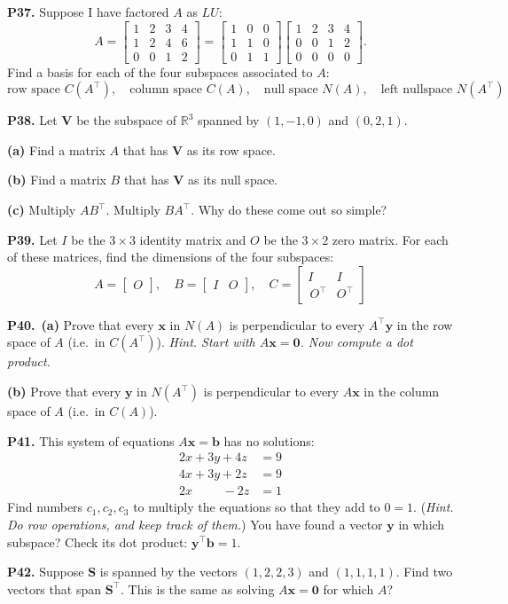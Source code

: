 \documentclass[12pt]{amsart}
\newcommand{\bb}{\bm{b}}
\newcommand{\bx}{\bm{x}}
\newcommand{\by}{\bm{y}}
\newcommand{\bS}{\bm{S}}
\newcommand{\bV}{\bm{V}}
\newcommand{\bzero}{\bm{0}}
\newcommand{\RR}{\mathbb{R}}
\newcommand{\prob}[1]{\bigskip\noindent\textbf{#1.}\quad }
\newcommand{\epart}[1]{\medskip\noindent\textbf{(#1)}\quad }
\newcommand{\ppart}[1]{\,\textbf{(#1)}\quad }
\begin{document}
\prob{P37}  Suppose I have factored $A$ as $LU$:
    $$A = \begin{bmatrix} 1 & 2 & 3 & 4 \\
                         1 & 2 & 4 & 6 \\
                         0 & 0 & 1 & 2 \end{bmatrix}
        = \begin{bmatrix} 1 & 0 & 0 \\ 1 & 1 & 0 \\ 0 & 1 & 1 \end{bmatrix}
          \begin{bmatrix} 1 & 2 & 3 & 4 \\ 0 & 0 & 1 & 2 \\ 0 & 0 & 0 & 0 \end{bmatrix}.$$
Find a basis for each of the four subspaces associated to $A$:
    $$\text{row space } C(A^\top), \quad \text{column space } C(A), \quad \text{null space } N(A), \quad \text{left nullspace } N(A^\top)$$


\prob{P38}  Let $\bV$ be the subspace of $\RR^3$ spanned by $(1,-1,0)$ and $(0,2,1)$.

\epart{a} Find a matrix $A$ that has $\bV$ as its row space.

\epart{b} Find a matrix $B$ that has $\bV$ as its null space.

\epart{c} Multiply $AB^\top$.  Multiply $BA^\top$.  Why do these come out so simple?


\prob{P39}  Let $I$ be the $3\times 3$ identity matrix and $O$ be the $3\times 2$ zero matrix.  For each of these matrices, find the dimensions of the four subspaces:
    $$A = \begin{bmatrix} O \end{bmatrix}, \quad B = \begin{bmatrix} I & O \end{bmatrix}, \quad C = \begin{bmatrix} I & I \\ \,O^\top & O^\top \end{bmatrix}$$


\prob{P40} \ppart{a}  Prove that every $\bx$ in $N(A)$ is perpendicular to every $A^\top \by$ in the row space of $A$ (i.e.~in $C(A^\top)$).  \emph{Hint. Start with $A \bx = \bzero$.  Now compute a dot product.}

\epart{b}  Prove that every $\by$ in $N(A^\top)$ is perpendicular to every $A \bx$ in the column space of $A$ (i.e.~in $C(A)$).


\prob{P41}  This system of equations $A\bx = \bb$ has no solutions:
\begin{align*}
2 x + 3 y + 4 z &= 9 \\
4 x + 3 y + 2 z &= 9 \\
2 x \phantom{+sxx} - 2 z &= 1
\end{align*}
Find numbers $c_1,c_2,c_3$ to multiply the equations so that they add to $0=1$.  (\emph{Hint.  Do row operations, and keep track of them.})  You have found a vector $\by$ in which subspace?  Check its dot product: $\by^\top \bb = 1$.


\prob{P42}  Suppose $\bS$ is spanned by the vectors $(1,2,2,3)$ and $(1,1,1,1)$.  Find two vectors that span $\bS^\top$.  This is the same as solving $A\bx = \bzero$ for which $A$?
\end{document}
